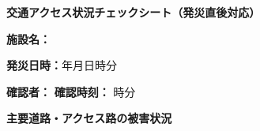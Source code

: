 \documentclass[a4paper,12pt]{jarticle}
\newcommand{\underlinespace}[1]{\underline{\hspace{#1}}}
\begin{document}
\begin{center}
{\Large\textbf{交通アクセス状況チェックシート（発災直後対応）}}
\end{center}
\vspace{5mm}

\noindent
\textbf{施設名：} \underlinespace{8cm}

\vspace{3mm}

\noindent
\textbf{発災日時：}\underlinespace{2cm}年\underlinespace{1cm}月\underlinespace{1cm}日\underlinespace{1cm}時\underlinespace{1cm}分

\vspace{3mm}

\noindent
\textbf{確認者：} \underlinespace{4cm} \quad \textbf{確認時刻：} \underlinespace{1cm}時\underlinespace{1cm}分

\vspace{8mm}

\begin{center}
\textbf{\large 主要道路・アクセス路の被害状況}
\end{center}

\vspace{3mm}
\end{document}
